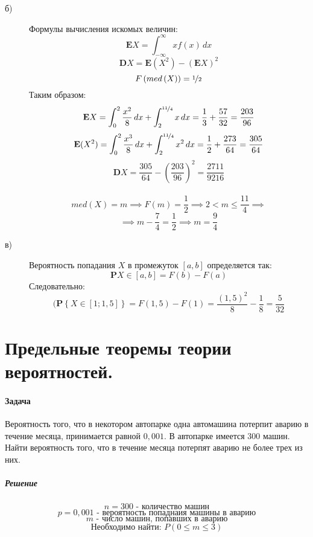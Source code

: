 \documentclass[fleqn, 10pt]{article}
\begin{document}
\begin{description}
\item[б)]
  Формулы вычисления искомых величин:
  \[\textbf{E}X = \int_{-\infty}^{\infty} xf(x) \,dx\]
  \[\textbf{D}X = \textbf{E}(X^2) - (\textbf{E}X)^2\]
  \[F\left(med\left(X\right)\right) = \nicefrac{1}{2}\]
  Таким образом:
  \[\textbf{E}X = \int_{0}^{2}\frac{x^2}{8}\,dx + \int_{2}^{\nicefrac{11}{4}} x\,dx = \frac{1}{3} + \frac{57}{32} = \frac{203}{96}\]
  \[\textbf{E}(X^2) =  \int_{0}^{2}\frac{x^3}{8}\,dx + \int_{2}^{\nicefrac{11}{4}} x^2\,dx = \frac{1}{2} + \frac{273}{64} = \frac{305}{64}\]
  \[\textbf{D}X = \frac{305}{64} - \left(\frac{203}{96}\right)^2 = \frac{2711}{9216}\]
  \\
  \[med(X) = m \implies F(m) = \frac{1}{2} \implies 2 < m \leq{\frac{11}{4}} \implies \]
  \[\implies m - \frac{7}{4} = \frac{1}{2} \implies m = \frac{9}{4}\]
\item[в)]
  Вероятность попадания \(X\) в промежуток \([a, b]\) определяется так:
  \[\textbf{P}{X \in [a, b]} = F(b) - F(a)\]
  Следовательно:
  \[(\textbf{P}\left \{X \in [1; 1,5]\right \} = F(1,5) - F(1) = \frac{(1,5)^2}{8}-\frac{1}{8} = \frac{5}{32}\]
\end{description}


\newpage


\section{Предельные теоремы теории вероятностей.}
\paragraph{Задача}
Вероятность того, что в некотором автопарке одна автомашина потерпит аварию в течение месяца, принимается равной \(0,001\). В автопарке имеется \(300\) машин. Найти вероятность того, что в течение месяца потерпят аварию не более трех из них.
\subparagraph{Решение}
\[n = 300 \text{ - количество машин}\]
\[p = 0,001 \text{ - вероятность попаднаия машины в аварию}\]
\[m \text{ - число машин, попавших в аварию}\]
\[\text{Необходимо найти: } P(0 \leq m \leq 3)\]
\end{document}
